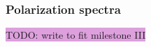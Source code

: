\documentclass{aa}
\numberwithin{equation}{section}
\numberwithin{table}{section}
\numberwithin{figure}{section}
\begin{document}




\subsubsection{Polarization spectra}
\colorbox{Plum}{TODO: write to fit milestone III}

\end{document}
